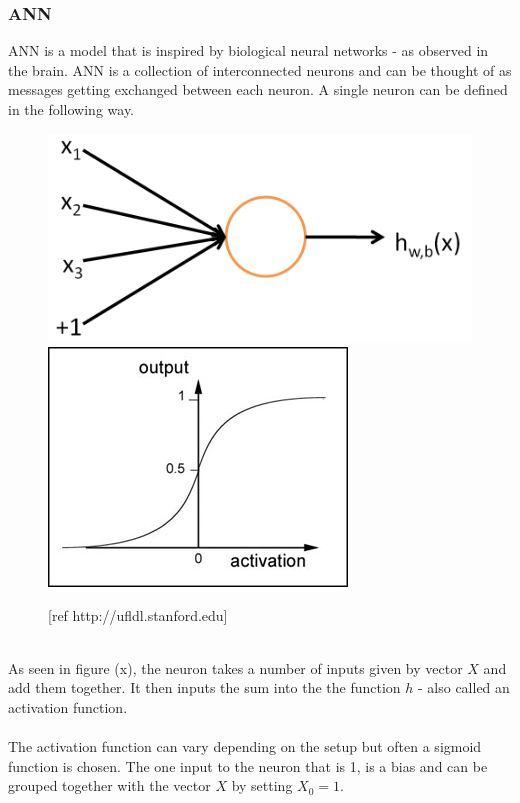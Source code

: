 \documentclass[11pt, a4paper]{article}
\begin{document}
\subsubsection{ANN}
ANN is a model that is inspired by biological neural networks - as observed in the brain. ANN is a collection of interconnected neurons and can be thought of as messages getting exchanged between each neuron. A single neuron can be defined in the following way.
\begin{figure}[!ht]
\centering
\includegraphics[scale=0.2]{SingleNeuron}
\includegraphics[scale=0.5]{sigmoid}
\caption{[ref http://ufldl.stanford.edu]}
\end{figure}
\\
As seen in figure (x), the neuron takes a number of inputs given by vector $ X $ and add them together. It then inputs the sum into the the function $ h $ - also called an activation function. %
\\
\\
The activation function can vary depending on the setup but often a sigmoid function is chosen. The one input to the neuron that is 1, is a bias and can be grouped together with the vector $ X $ by setting $ X_0 = 1 $.
\\
\\
\end{document}
